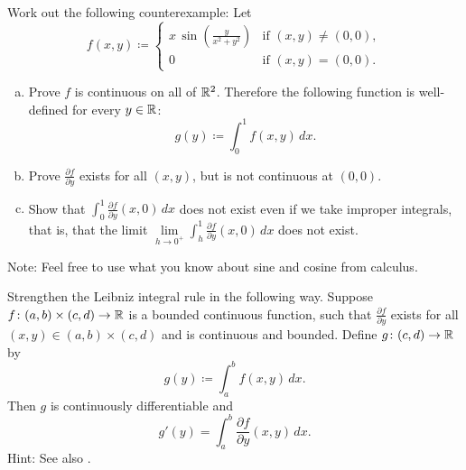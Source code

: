 \begin{exercise}
\pagebreak[2]
Work out the following counterexample:  Let
\begin{equation*}
f(x,y) \coloneqq
\begin{cases}
x \,\sin \left(\frac{y}{x^2+y^2}\right) & \text{if } (x,y) \neq (0,0),\\
0                                       & \text{if } (x,y)=(0,0).
\end{cases}
\end{equation*}
\begin{enumerate}[a)]
\item
Prove $f$ is continuous on all of ${\mathbb{R}}^2$.
Therefore the following function is well-defined for every $y \in {\mathbb{R}}$:
\begin{equation*}
g(y) \coloneqq \int_0^1 f(x,y) \, dx .
\end{equation*}
\item
Prove $\frac{\partial f}{\partial y}$ exists for all $(x,y)$,
but is not continuous at $(0,0)$.
\item
Show that $\int_0^1 \frac{\partial f}{\partial y}(x,0) \, dx$ does not
exist even if we take improper integrals, that is,
that the limit
$\lim\limits_{h \to 0^+} \int_h^1 \frac{\partial f}{\partial y}(x,0) \, dx$
does not exist.
\end{enumerate}
Note: Feel free to use what you know about sine and cosine from calculus.
\end{exercise}

\begin{exercise} \label{exercise:strongerleibniz}
\pagebreak[3]
Strengthen the Leibniz integral rule in the following way.
Suppose $f \colon (a,b) \times (c,d) \to {\mathbb{R}}$ is a bounded continuous function,
such that $\frac{\partial f}{\partial y}$ exists for all $(x,y) \in (a,b)
\times (c,d)$ and is continuous and bounded.  Define $g \colon (c,d) \to {\mathbb{R}}$
by
\begin{equation*}
g(y) \coloneqq \int_a^b f(x,y) \,dx .
\end{equation*}
Then $g$ is continuously differentiable and
\begin{equation*}
g'(y) = \int_a^b \frac{\partial f}{\partial y}(x,y) \,dx .
\end{equation*}
Hint: See also .
\end{exercise}

